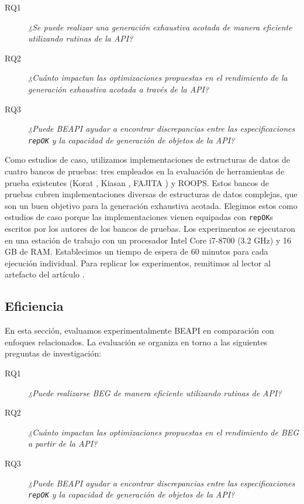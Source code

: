 \begin{description}
\item[RQ1] \emph{¿Se puede realizar una generación exhaustiva acotada de manera eficiente utilizando rutinas de la API?}
\item[RQ2] \emph{¿Cuánto impactan las optimizaciones propuestas en el rendimiento de la generación exhaustiva acotada a través de la API?}
\item[RQ3] \emph{¿Puede \textsf{BEAPI} ayudar a encontrar discrepancias entre las especificaciones \texttt{repOK} y la capacidad de generación de objetos de la API?}
\end{description}

Como estudios de caso, utilizamos implementaciones de estructuras de datos de cuatro bancos de pruebas: tres empleados en la evaluación de herramientas de prueba existentes (\textsf{Korat} \cite{Boyapati02}, \textsf{Kiasan} \cite{Deng06}, \textsf{FAJITA} \cite{Abad13}) y \textsf{ROOPS}. Estos bancos de pruebas cubren implementaciones diversas de estructuras de datos complejas, que son un buen objetivo para la generación exhaustiva acotada. Elegimos estos como estudios de caso porque las implementaciones vienen equipadas con \texttt{repOK}s escritos por los autores de los bancos de pruebas. Los experimentos se ejecutaron en una estación de trabajo con un procesador Intel Core i7-8700 (3.2 GHz) y 16 GB de RAM. Establecimos un tiempo de espera de 60 minutos para cada ejecución individual. Para replicar los experimentos, remitimos al lector al artefacto del artículo \cite{artifact}.
\subsection{Eficiencia}

En esta sección, evaluamos experimentalmente \textsf{BEAPI} en comparación con enfoques relacionados. La evaluación se organiza en torno a las siguientes preguntas de investigación:
\begin{description}
\item[RQ1] \emph{¿Puede realizarse BEG de manera eficiente utilizando rutinas de API?}
\item[RQ2] \emph{¿Cuánto impactan las optimizaciones propuestas en el rendimiento de BEG a partir de la API?}
\item[RQ3] \emph{¿Puede \textsf{BEAPI} ayudar a encontrar discrepancias entre las especificaciones \texttt{repOK} y la capacidad de generación de objetos de la API?}
\end{description}

